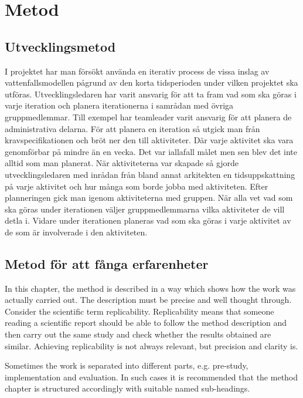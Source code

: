 \chapter{Metod}
\label{cha:method}

\section{Utvecklingsmetod}
I projektet har man försökt använda en iterativ process de vissa inslag av vattenfallsmodellen pågrund av den korta tidsperioden under vilken projektet ska utföras. Utvecklingsledaren har varit ansvarig för att ta fram vad som ska göras i varje iteration och planera iterationerna i samrådan med övriga gruppmedlemmar. Till exempel har teamleader varit ansvarig för att planera de administrativa delarna. För att planera en iteration så utgick man från kravspecifikationen och bröt ner den till aktiviteter. Där varje aktivitet ska vara genomförbar på mindre än en vecka. Det var iallafall målet men sen blev det inte alltid som man planerat. När aktiviteterna var skapade så gjorde utvecklingsledaren med inrådan från bland annat arkitekten en tidsuppskattning på varje aktivitet och hur många som borde jobba med aktiviteten. Efter planneringen gick man igenom aktiviteterna med gruppen. När alla vet vad som ska göras under iterationen väljer gruppmedlemmarna vilka aktiviteter de vill detla i. Vidare under iterationen planeras vad som ska göras i varje aktivitet av de som är involverade i den aktiviteten.


\section{Metod för att fånga erfarenheter}

In this chapter, the method is described in a way which shows how the
work was actually carried out. The description must be precise and
well thought through. Consider the scientific term
replicability. Replicability means that someone reading a scientific
report should be able to follow the method description and then carry
out the same study and check whether the results obtained are
similar. Achieving replicability is not always relevant, but precision
and clarity is.

Sometimes the work is separated into different parts, e.g.  pre-study,
implementation and evaluation. In such cases it is recommended that
the method chapter is structured accordingly with suitable named
sub-headings.

